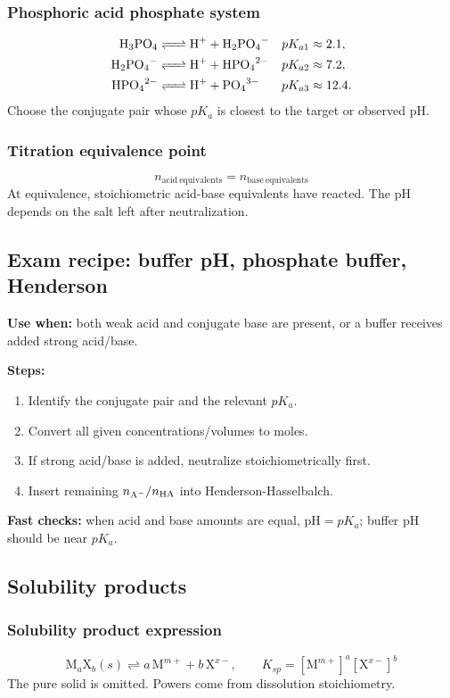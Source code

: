 \subsubsection{Phosphoric acid phosphate system}
\[
\begin{aligned}
\ce{H3PO4 &<=> H+ + H2PO4-} && pK_{a1}\approx2.1,\\
\ce{H2PO4- &<=> H+ + HPO4^2-} && pK_{a2}\approx7.2,\\
\ce{HPO4^2- &<=> H+ + PO4^3-} && pK_{a3}\approx12.4.
\end{aligned}
\]
Choose the conjugate pair whose \(pK_a\) is closest to the target or observed pH.

\subsubsection{Titration equivalence point}
\[
n_{\mathrm{acid\ equivalents}}=n_{\mathrm{base\ equivalents}}
\]
At equivalence, stoichiometric acid-base equivalents have reacted. The pH depends on the salt left after neutralization.

\subsection{Exam recipe: buffer pH, phosphate buffer, Henderson}
\textbf{Use when:} both weak acid and conjugate base are present, or a buffer receives added strong acid/base.

\textbf{Steps:}
\begin{enumerate}
    \item Identify the conjugate pair and the relevant \(pK_a\).
    \item Convert all given concentrations/volumes to moles.
    \item If strong acid/base is added, neutralize stoichiometrically first.
    \item Insert remaining \(n_{\ce{A-}}/n_{\ce{HA}}\) into Henderson-Hasselbalch.
\end{enumerate}

\textbf{Fast checks:} when acid and base amounts are equal, \(\mathrm{pH}=pK_a\); buffer pH should be near \(pK_a\).

\subsection{Solubility products}

\subsubsection{Solubility product expression}
\[
\mathrm{M}_a\mathrm{X}_b(s)\rightleftharpoons a\,\mathrm{M}^{m+}+b\,\mathrm{X}^{x-}, \qquad
K_{sp}=[\mathrm{M}^{m+}]^a[\mathrm{X}^{x-}]^b
\]
The pure solid is omitted. Powers come from dissolution stoichiometry.

